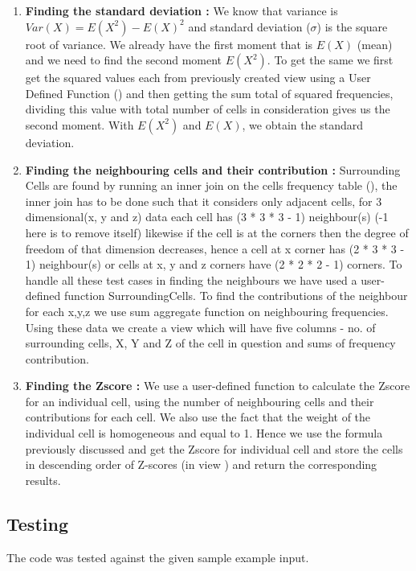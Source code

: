 \begin{enumerate}
    \item \textbf{Finding the standard deviation :} We know that variance is  $Var(X) = E(X^2) - E(X)^2$ and standard deviation ($\sigma$) is the square root of variance. We already have the first moment that is $E(X)$ (mean) and we need to find the second moment $E(X^2)$. To get the same we first get the squared values each from previously created view using a User Defined Function () and then getting the sum total of squared frequencies, dividing this value with total number of cells in consideration gives us the second moment. With $E(X^2)$ and $E(X)$, we obtain the standard deviation.
    \item \textbf{Finding the neighbouring cells and their contribution :} Surrounding Cells are found by running an inner join on the cells frequency table (), the inner join has to be done such that it considers only adjacent cells, for 3 dimensional(x, y and z) data each cell has (3 * 3 * 3 - 1) neighbour(s) (-1 here is to remove itself)  likewise if the cell is at the corners then the degree of freedom of that dimension decreases, hence a cell at x corner has (2 * 3 * 3 - 1) neighbour(s) or cells at x, y and z corners have (2 * 2 * 2 - 1) corners. To handle all these test cases in finding the neighbours we have used a user-defined function SurroundingCells. To find the contributions of the neighbour for each x,y,z we use sum aggregate function on neighbouring frequencies. Using these data we create a view which will have five columns -  no. of surrounding cells, X, Y and Z of the cell in question and sums of frequency contribution.
    \item \textbf{Finding the Zscore :} We use a user-defined function  to calculate the Zscore for an individual cell, using the number of neighbouring cells and their contributions for each cell. We also use the fact that the weight of the individual cell is homogeneous and equal to 1. Hence we use the formula previously discussed and get the Zscore for individual cell and store the cells in descending order of Z-scores (in view ) and return the corresponding results.
\end{enumerate}

\subsection{Testing}
The code was tested against the given sample example input.


